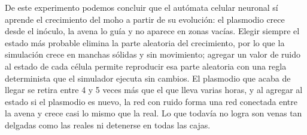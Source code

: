 
De este experimento podemos concluir que el autómata celular neuronal sí aprende el crecimiento del moho a partir de su evolución: el plasmodio crece desde el inóculo, la avena lo guía y no aparece en zonas vacías. Elegir siempre el estado más probable elimina la parte aleatoria del crecimiento, por lo que la simulación crece en manchas sólidas y sin movimiento; agregar un valor de ruido al estado de cada célula permite reproducir esa parte aleatoria con una regla determinista que el simulador ejecuta sin cambios. El plasmodio que acaba de llegar se retira entre 4 y 5 veces más que el que lleva varias horas, y al agregar al estado si el plasmodio es nuevo, la red con ruido forma una red conectada entre la avena y crece casi lo mismo que la real. Lo que todavía no logra son venas tan delgadas como las reales ni detenerse en todas las cajas.

